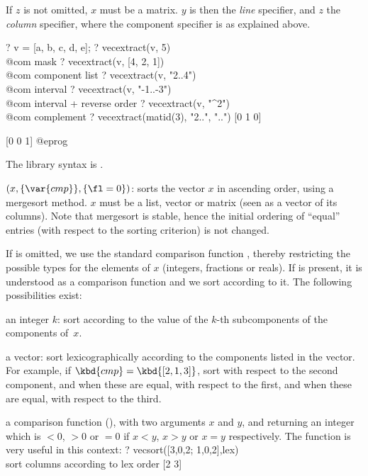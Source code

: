If $z$ is not omitted, $x$ must be a matrix. $y$ is then the \emph{line}
specifier, and $z$ the \emph{column} specifier, where the component specifier
is as explained above.

\bprog
? v = [a, b, c, d, e];
? vecextract(v, 5)          \\@com mask
? vecextract(v, [4, 2, 1])  \\@com component list
? vecextract(v, "2..4")     \\@com interval
? vecextract(v, "-1..-3")   \\@com interval + reverse order
? vecextract(v, "^2")       \\@com complement
? vecextract(matid(3), "2..", "..")
[0 1 0]

[0 0 1]
@eprog

The library syntax is .

$(x,\{\var{cmp}\},\{\fl=0\})$: \label{se:vecsort}sorts the vector $x$ in ascending order, using a mergesort method.
$x$ must be a list, vector or matrix (seen as a vector of its columns).
Note that mergesort is stable, hence the initial ordering of ``equal''
entries (with respect to the sorting criterion) is not changed.

If  is omitted, we use the standard comparison function
\kbd{<}, thereby restricting the possible types for the elements of $x$
(integers, fractions or reals). If  is present, it is understood as
a comparison function and we sort according to it. The following
possibilities exist:

\item an integer $k$: sort according to the value of the $k$-th
subcomponents of the components of~$x$.

\item a vector: sort lexicographically according to the components listed in
the vector. For example, if $\kbd{cmp}=\kbd{[2,1,3]}$, sort with respect to
the second component, and when these are equal, with respect to the first,
and when these are equal, with respect to the third.

\item a comparison function (), with two arguments $x$ and $y$,
and returning an integer which is $<0$, $>0$ or $=0$ if $x<y$, $x>y$ or
$x=y$ respectively. The  function is very useful in this context:
\bprog
? vecsort([3,0,2; 1,0,2],lex) \\ sort columns according to lex order
[2 3]


